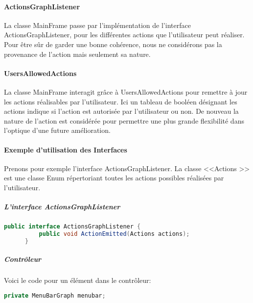 \documentclass[french]{article}
\begin{document}
    \paragraph{ActionsGraphListener}

      La classe MainFrame passe par l'implémentation de l'interface ActionsGraphListener,
      pour les différentes actions que l'utilisateur peut réaliser. Pour être
      sûr de garder une bonne cohérence, nous ne considérons pas la provenance
      de l'action mais seulement sa nature.


    \paragraph{UsersAllowedActions}

      La classe MainFrame interagit grâce à UsersAllowedActions pour remettre
      à jour les actions réalisables par l'utilisateur. Ici un tableau de
      booléen désignant les actions indique si l'action est autorisée par
      l'utilisateur ou non. De nouveau la nature de l'action est considérée
      pour permettre une plus grande flexibilité dans l'optique d'une future
      amélioration.


    \paragraph*{Exemple d'utilisation des Interfaces}

      Prenons pour exemple l'interface ActionsGraphListener. La classe <<Actions
      >> est une classe Enum répertoriant toutes les actions possibles réalisées
      par l'utilisateur.



    \subparagraph{L'interface ActionsGraphListener}

      \begin{lstlisting}[backgroundcolor={\color{lgray}},language=Java]
      public interface ActionsGraphListener {
          public void ActionEmitted(Actions actions); 
      }
      \end{lstlisting}



    \subparagraph{Contrôleur}

      Voici le code pour un élément dans le contrôleur:

      \begin{lstlisting}[backgroundcolor={\color{lgray}},language=Java]
      private MenuBarGraph menubar;
      \end{lstlisting}
\end{document}
